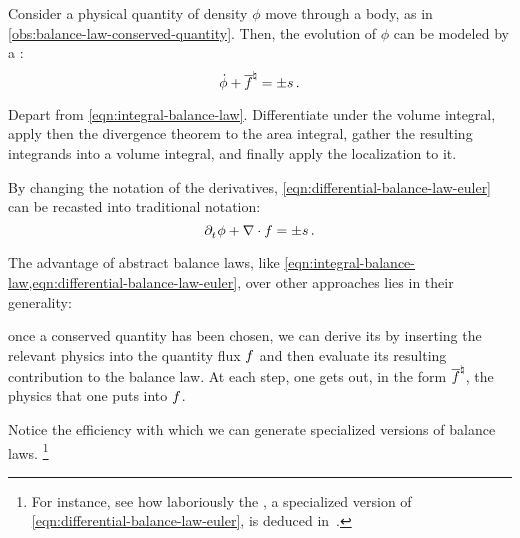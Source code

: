 \begin{model}
  Consider a physical quantity of density $\phi$ move through a body, as in \cref{obs:balance-law-conserved-quantity}. Then, the evolution of $\phi$ can be modeled by a :
  \begin{equation}\label{eqn:differential-balance-law-euler}
    \dot{\phi} + {\overline{f}}^{\natural} = \pm s\,.
  \end{equation}
\end{model}
%
\begin{argument}
  Depart from \cref{eqn:integral-balance-law}. Differentiate under the volume integral, apply then the divergence theorem to the area integral, gather the resulting integrands into a volume integral, and finally apply the localization to it.
\end{argument}
%
By changing the notation of the derivatives, \cref{eqn:differential-balance-law-euler} can be recasted into traditional notation:
%
\begin{equation}\label{eqn:differential-balance-law-euler-operator}
  \cpd t\phi + \odiv\flux = \pm\ssink\,.
\end{equation}

The advantage of abstract balance laws, like \cref{eqn:integral-balance-law,eqn:differential-balance-law-euler}, over other approaches lies in their generality:~\cite{thorne2013,mishra2016}
%
\begin{law}
  once a conserved quantity has been chosen, we can derive its  by inserting the relevant physics into the quantity flux $f$ and then evaluate its resulting contribution to the balance law. At each step, one gets out, in the form ${\overline{f}}^{\natural}$, the physics that one puts into $f$.
\end{law}
%
Notice the efficiency with which we can generate specialized versions of balance laws.
%
\footnote{For instance, see how laboriously the , a specialized version of \cref{eqn:differential-balance-law-euler}, is deduced in~\cite[p. 42]{holzbecher2012}.}

